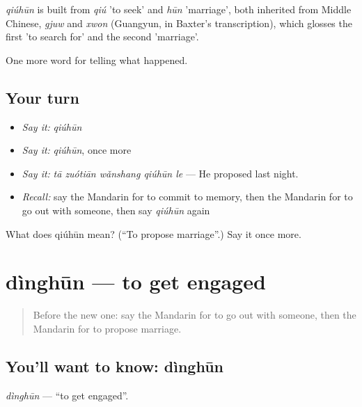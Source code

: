 \begin{cousinweb}
\emph{qiúhūn} is built from \emph{qiú} 'to seek' and \emph{hūn} 'marriage', both inherited from Middle Chinese, \emph{gjuw} and \emph{xwon} (Guangyun, in Baxter's transcription), which glosses the first 'to search for' and the second 'marriage'.
\end{cousinweb}

\begin{grammarlens}[title={What you've built}]
One more word for telling what happened.
\end{grammarlens}

\subsection*{Your turn}
\begin{itemize}
\raggedright
  \item \emph{Say it:} \emph{qiúhūn}
  \item \emph{Say it:} \emph{qiúhūn}, once more
  \item \emph{Say it:} \emph{tā zuótiān wǎnshang qiúhūn le} — He proposed last night.
  \item \emph{Recall:} say the Mandarin for to commit to memory, then the Mandarin for to go out with someone, then say \emph{qiúhūn} again
\end{itemize}

\begin{tcolorbox}[breakable,colback=teal!4,colframe=teal!35!black,title={Before you move on}]
What does qiúhūn mean? (\textquotedblleft{}To propose marriage\textquotedblright{}.) Say it once more.
\end{tcolorbox}
\section[dìnghūn]{dìnghūn — to get engaged}

\label{lesson:ZH-C305-dinghun}



\begin{quote}
Before the new one: say the Mandarin for to go out with someone, then the Mandarin for to propose marriage.
\end{quote}

\subsection*{You'll want to know: dìnghūn}
\emph{dìnghūn} — \textquotedblleft{}to get engaged\textquotedblright{}.

